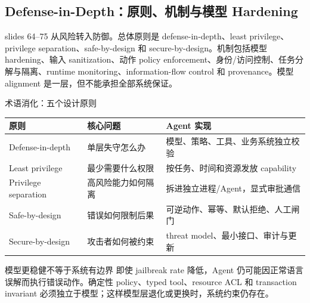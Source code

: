 \subsection{Defense-in-Depth：原则、机制与模型 Hardening}

slides 64--75 从风险转入防御。总体原则是 defense-in-depth、least privilege、privilege separation、safe-by-design 和 secure-by-design。机制包括模型 hardening、输入 sanitization、动作 policy enforcement、身份/访问控制、任务分解与隔离、runtime monitoring、information-flow control 和 provenance。模型 alignment 是一层，但不能承担全部系统保证。


\begin{knowledgebox}{术语消化：五个设计原则}
\begin{tabular}{p{3.0cm}p{4.2cm}p{5.0cm}}
\toprule
\textbf{原则} & \textbf{核心问题} & \textbf{Agent 实现} \\
\midrule
Defense-in-depth & 单层失守怎么办 & 模型、策略、工具、业务系统独立校验 \\
Least privilege & 最少需要什么权限 & 按任务、时间和资源发放 capability \\
Privilege separation & 高风险能力如何隔离 & 拆进独立进程/Agent，显式审批通信 \\
Safe-by-design & 错误如何限制后果 & 可逆动作、幂等、默认拒绝、人工闸门 \\
Secure-by-design & 攻击者如何被约束 & threat model、最小接口、审计与更新 \\
\bottomrule
\end{tabular}
\end{knowledgebox}

\begin{warningbox}{模型更稳健不等于系统有边界}
即使 jailbreak rate 降低，Agent 仍可能因正常语言误解而执行错误动作。确定性 policy、typed tool、resource ACL 和 transaction invariant 必须独立于模型；这样模型层退化或更换时，系统约束仍存在。
\end{warningbox}

